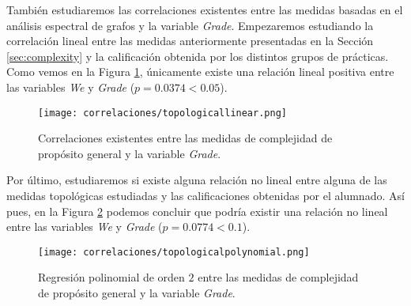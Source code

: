 También estudiaremos las correlaciones existentes entre las medidas basadas en el análisis espectral de grafos y la variable \emph{Grade}. Empezaremos estudiando la correlación lineal entre las medidas anteriormente presentadas en la Sección \ref{sec:complexity} y la calificación obtenida por los distintos grupos de prácticas. Como vemos en la Figura \ref{fig:correlations3}, únicamente existe una relación lineal positiva entre las variables \emph{We} y \emph{Grade} ($p = 0.0374 < 0.05$).

\begin{figure}[H]
    \centering
    \texttt{[image: correlaciones/topologicallinear.png]}
    \caption{Correlaciones existentes entre las medidas de complejidad de propósito general y la variable \emph{Grade}.}
    \label{fig:correlations3}
\end{figure}

Por último, estudiaremos si existe alguna relación no lineal entre alguna de las medidas topológicas estudiadas y las calificaciones obtenidas por el alumnado. Así pues, en la Figura \ref{fig:correlations4} podemos concluir que podría existir una relación no lineal entre las variables \emph{We} y \emph{Grade} ($p = 0.0774 < 0.1$).

\begin{figure}[H]
    \centering
    \texttt{[image: correlaciones/topologicalpolynomial.png]}
    \caption{Regresión polinomial de orden $2$ entre las medidas de complejidad de propósito general y la variable \emph{Grade}.}
    \label{fig:correlations4}
\end{figure}